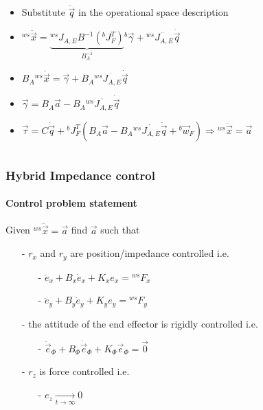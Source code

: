 \begin{frame}[shrink=15]
\begin{columns}
\begin{column}{2\textwidth}
\begin{itemize}
      \item<6->[]Substitute $\ddot{\vec{q}}$ in the operational space description
      \item<6->[]${}^{ws} \ddot{\vec{x}} = \underbrace{{}^{ws} J_{A,E} B^{-1} ({}^b J_{F}^T)}_{B_A^{-1}} {}^b \vec{\gamma} + {}^{ws} \ddot{J_{A,E}} \dot{\vec{q}}$
      \item<7->[]$B_A {}^{ws} \ddot{\vec{x}} =  \vec{\gamma} +  B_A  {}^{ws} \dot{J_{A,E}} \dot{\vec{q}}$
      \item<8->[]$\vec{\gamma} = B_A \vec{a} - B_A {}^{ws} \dot{J_{A,E}} \dot{\vec{q}}$
      \item<9->[]$\vec{\tau} = C \dot{\vec{q}} + {}^{b}J^{T}_{F} ( B_A \vec{a} - B_A {}^{ws} \dot{J_{A,E}} \dot{\vec{q}} + {}^b\vec{w}_{F})
        \Longrightarrow {}^{ws}\ddot{\vec{x}} = \vec{a} $
      \end{itemize}
    \end{column}
  \end{columns}
\end{frame}

\begin{frame}
  \frametitle{Hybrid Impedance control}
  \framesubtitle{Control problem statement}
  Given ${}^{ws}\ddot{\vec{x}} = \vec{a} $ find $\vec{a}$ such that
  \begin{itemize}
  \item[-]$r_x$ and $r_y$ are position/impedance controlled i.e.
    \begin{itemize}
    \item[-] $\ddot{e}_{x} + B_x \dot{e}_x + K_x e_x = {}^{ws}F_x$
    \item[-] $\ddot{e}_{y} + B_y \dot{e}_y + K_y e_y = {}^{ws}F_y$
    \end{itemize}
  \item[-]the attitude of the end effector is rigidly controlled i.e.
    \begin{itemize}
    \item[-] $\ddot{\vec{e}}_{\Phi} + B_{\Phi} \dot{\vec{e}}_{\Phi} + K_{\Phi} \vec{e}_{\Phi} = \vec{0}$
    \end{itemize}
  \item[-]$r_z$ is force controlled i.e.
    \begin{itemize}
    \item[-] $e_z \xrightarrow[t \to \infty]{} 0$
    \end{itemize}
  \end{itemize}
\end{frame}

